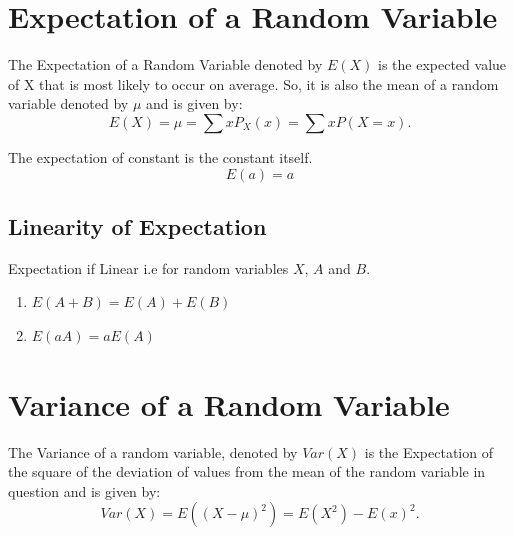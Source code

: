 \section{Expectation of a Random Variable}
\label{sec:expectation-of-a-random-variable}

The Expectation of a Random Variable denoted by \(E(X)\)
is the expected value of X that is most likely to
occur on average. So, it is also the mean of a random
variable denoted by \(\mu\) and is given by:
\[
  E(X) = \mu = \sum{xP_X(x)} = \sum{xP(X=x)}
.\]

The expectation of constant is the constant itself.
\[ E(a)=a \] 

\subsection{Linearity of Expectation}
\label{ssec:linearity-of-expectation}
Expectation if Linear i.e for random variables \(X\), \(A\)
and \(B\).
\begin{enumerate}
  \item \(E(A+B) = E(A) + E(B)\)
  \item \(E(aA) = aE(A)\)
\end{enumerate}

\section{Variance of a Random Variable}
\label{sec:variance-of-a-random-variable}

The Variance of a random variable, denoted by \(Var(X)\) is
the Expectation of the square of the deviation of values
from the mean of the random variable in question and is
given by:
\[
  Var(X) = E((X-\mu)^{2}) = E(X^2) - E(x)^{2}
.\] 
